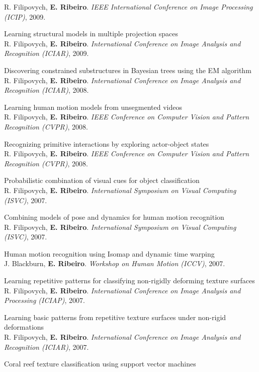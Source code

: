 \documentclass[11pt]{article}
\begin{document}
\begin{cvitems}
  R. Filipovych, \textbf{E. Ribeiro}. \textit{IEEE International Conference on Image Processing (ICIP)}, 2009.
  \item Learning structural models in multiple projection spaces\\
  R. Filipovych, \textbf{E. Ribeiro}. \textit{International Conference on Image Analysis and Recognition (ICIAR)}, 2009.
  \item Discovering constrained substructures in Bayesian trees using the EM algorithm\\
  R. Filipovych, \textbf{E. Ribeiro}. \textit{International Conference on Image Analysis and Recognition (ICIAR)}, 2008.
  \item Learning human motion models from unsegmented videos\\
  R. Filipovych, \textbf{E. Ribeiro}. \textit{IEEE Conference on Computer Vision and Pattern Recognition (CVPR)}, 2008.
  \item Recognizing primitive interactions by exploring actor-object states\\
  R. Filipovych, \textbf{E. Ribeiro}. \textit{IEEE Conference on Computer Vision and Pattern Recognition (CVPR)}, 2008.
  \item Probabilistic combination of visual cues for object classification\\
  R. Filipovych, \textbf{E. Ribeiro}. \textit{International Symposium on Visual Computing (ISVC)}, 2007.
  \item Combining models of pose and dynamics for human motion recognition\\
  R. Filipovych, \textbf{E. Ribeiro}. \textit{International Symposium on Visual Computing (ISVC)}, 2007.
  \item Human motion recognition using Isomap and dynamic time warping\\
  J. Blackburn, \textbf{E. Ribeiro}. \textit{Workshop on Human Motion (ICCV)}, 2007.
  \item Learning repetitive patterns for classifying non-rigidly deforming texture surfaces\\
  R. Filipovych, \textbf{E. Ribeiro}. \textit{International Conference on Image Analysis and Processing (ICIAP)}, 2007.
  \item Learning basic patterns from repetitive texture surfaces under non-rigid deformations\\
  R. Filipovych, \textbf{E. Ribeiro}. \textit{International Conference on Image Analysis and Recognition (ICIAR)}, 2007.
  \item Coral reef texture classification using support vector machines\\

\end{cvitems}
\end{document}
